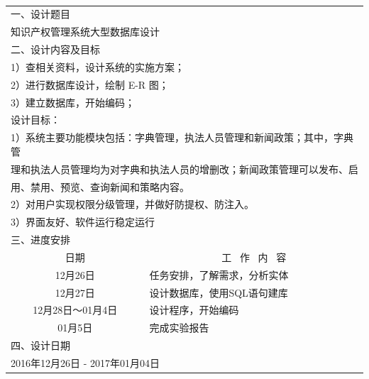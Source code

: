 \documentclass[a4paper, 12pt]{article}
\begin{document}
\setmainfont{Times New Roman}

\begin{center}
  \fontsize{18pt}{0}\selectfont{知识产权管理系统大型数据库设计任务书} \\
\end{center}

{\setlength\extrarowheight{6pt}
	\begin{tabular}{|c|l|}
		\hline
		\multicolumn{2}{|l|}{ 一、设计题目 } \\
		\multicolumn{2}{|l|}{ 知识产权管理系统大型数据库设计 } \\
		\hline
		\multicolumn{2}{|l|}{ 二、设计内容及目标 } \\
		\multicolumn{2}{|l|}{ 1）查相关资料，设计系统的实施方案；} \\
		\multicolumn{2}{|l|}{ 2）进行数据库设计，绘制 E-R 图；} \\
		\multicolumn{2}{|l|}{ 3）建立数据库，开始编码；} \\
		\multicolumn{2}{|l|}{ 设计目标：} \\
		\multicolumn{2}{|l|}{ 1）系统主要功能模块包括：字典管理，执法人员管理和新闻政策；其中，字典管} \\
		\multicolumn{2}{|l|}{ 理和执法人员管理均为对字典和执法人员的增删改；新闻政策管理可以发布、启} \\
		\multicolumn{2}{|l|}{ 用、禁用、预览、查询新闻和策略内容。} \\
		\multicolumn{2}{|l|}{ 2）对用户实现权限分级管理，并做好防提权、防注入。} \\
		\multicolumn{2}{|l|}{ 3）界面友好、软件运行稳定运行} \\
		\hline
		\multicolumn{2}{|l|}{ 三、进度安排 } \\
		\hline
		日期 				& \multicolumn{1}{c|}{工 \ 作 \ 内 \ 容} \\
		\hline
		12月26日 			& 任务安排，了解需求，分析实体 \\
		\hline
		12月27日 			& 设计数据库，使用SQL语句建库 \\
		\hline
		12月28日～01月4日	& 设计程序，开始编码 \\
		\hline
		01月5日	& 完成实验报告 \\
		\hline
		\multicolumn{2}{|l|}{ 四、设计日期 } \\
		\hline
		\multicolumn{2}{|l|}{ 2016年12月26日 - 2017年01月04日 } \\
		\hline
	\end{tabular}
}
	\thispagestyle{empty}
	\clearpage
	\setcounter{page}{1}
	\setlength{\parskip}{-0.1em}
\end{document}
